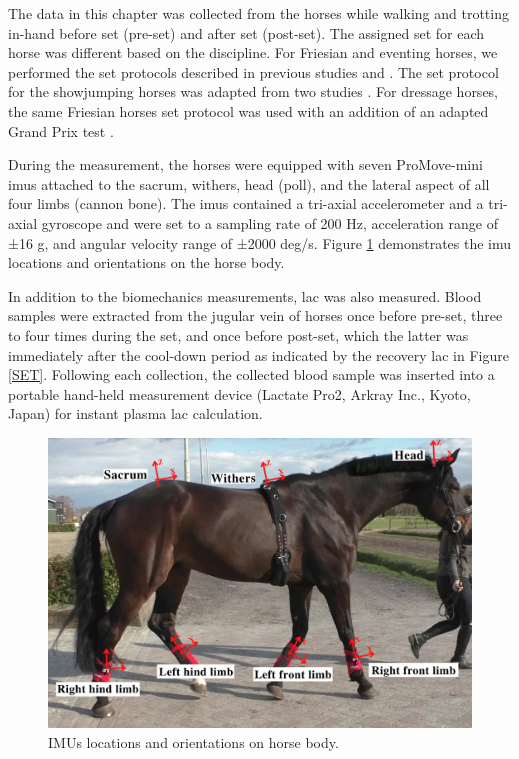 The data in this chapter was collected from the horses while walking and trotting in-hand before \gls{set} (pre-\gls{set}) and after \gls{set} (post-\gls{set}). The assigned \gls{set} for each horse was different based on the discipline. For Friesian and eventing horses, we performed the \gls{set} protocols described in previous studies \cite{MUNSTERS2013193} and \cite{CBM}. The \gls{set} protocol for the showjumping horses was adapted from two studies \cite{Munk2013EffectsJumping,articlesoares}. For dressage horses, the same Friesian horses \gls{set} protocol was used with an addition of an adapted Grand Prix test  \cite{FEI_test}.

During the measurement, the horses were equipped with seven ProMove-mini \gls{imu}s \cite{456} attached to the sacrum, withers, head (poll), and the lateral aspect of all four limbs (cannon bone). The \gls{imu}s contained a tri-axial accelerometer and a tri-axial gyroscope and were set to a sampling rate of 200 Hz, acceleration range of ±16 g, and angular velocity range of ±2000 deg/s. Figure \ref{fig:IMUplacement} demonstrates the \gls{imu} locations and orientations on the horse body. 

In addition to the biomechanics measurements, \gls{lac} was also measured. Blood samples were extracted from the jugular vein of horses once before pre-\gls{set}, three to four times during the \gls{set}, and once before post-\gls{set}, which the latter was immediately after the cool-down period as indicated by the recovery \gls{lac} in Figure \ref{SET}. Following each collection, the collected blood sample was inserted into a portable hand-held measurement device (Lactate Pro2, Arkray Inc., Kyoto, Japan) for instant plasma \gls{lac} calculation.  
 

\begin{figure}[htbp]
\centering
\includegraphics[width=.95\linewidth]{chapters/prepost/figures/Sacrum_HQ.png}
\caption{IMUs locations and orientations on horse body.}
\label{fig:IMUplacement}
\end{figure}

